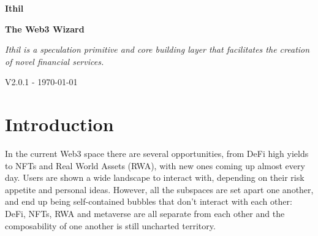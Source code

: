 \documentclass[a4paper,10 pt]{article}
\theoremstyle{definition}
\begin{document}
\begin{titlepage}
    \begin{center}
        \vspace*{1cm}
            
        \Huge
        \textbf{Ithil}

        \vspace{0.5cm}
        \Large
        {\bf The Web3 Wizard}

        \vspace{1cm}
        \Large
        {\it Ithil is a speculation primitive and core building layer that facilitates the creation of novel financial services.}

        \vspace{1.5cm}
        {\normalsize V2.0.1 - \today}
        \vspace{1.0cm}

        \begin{abstract}        
        Ithil aims to become the base layer for decentralised financial services via a well-thought system of composable smart contracts, paired with liquidity vaults to issue debit or credit to.
        
        Modular and easily upgradable, Ithil offers users and other protocols composable audited lego blocks, enabling an entirely new range of financial opportunities to be created. Developers can speed up the go-to-market by having an existing infrastructure and access to liquidity from day 1, investors can find novel solutions to speculate on and lenders can get hedged exposure to the whole web3 space from a single platform.
        \end{abstract}
            
    \end{center}
\tableofcontents
\end{titlepage}

\section{Introduction}

In the current Web3 space there are several opportunities, from DeFi high yields to NFTs and Real World Assets (RWA), with new ones coming up almost every day. Users are shown a wide landscape to interact with, depending on their risk appetite and personal ideas. However, all the subspaces are set apart one another, and end up being self-contained bubbles that don't interact with each other: DeFi, NFTs, RWA and metaverse are all separate from each other and the composability of one another is still uncharted territory.
\end{document}
